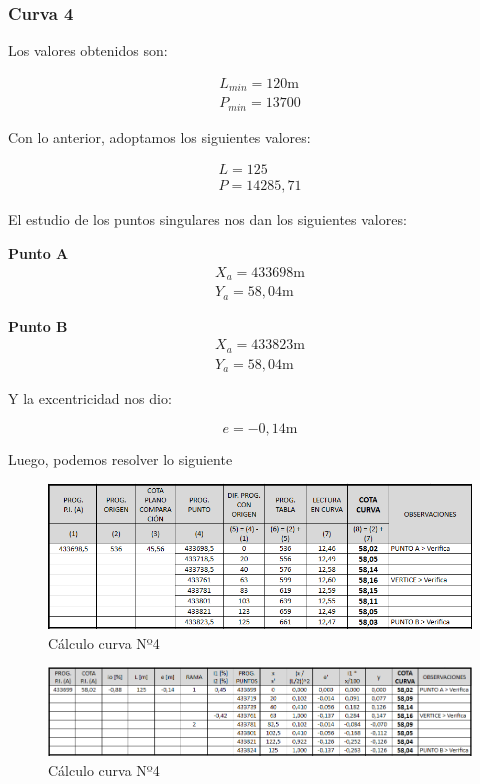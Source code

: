 \documentclass[../main.tex]{subfiles}
\begin{document}
\subsubsection{Curva 4}
Los valores obtenidos son:

\begin{align*}
    L_{min} = 120 \text{m} \\
    P_{min} = 13700
\end{align*}

Con lo anterior, adoptamos los siguientes valores:

\begin{align*}
    L = 125 \\
    P = 14285,71 
\end{align*}

El estudio de los puntos singulares nos dan los siguientes valores:

\textbf{Punto A}
\begin{align*}
    X_a = 433698 \text{m} \\
    Y_a = 58,04 \text{m}
\end{align*}

\textbf{Punto B}
\begin{align*}
    X_a = 433823 \text{m} \\
    Y_a = 58,04 \text{m}
\end{align*}

Y la excentricidad nos dio:

\begin{equation*}
    e = -0,14 \text{m}
\end{equation*}

Luego, podemos resolver lo siguiente

\begin{figure}[h]
    \centering
    \includegraphics[width=\textwidth]{images/google_sheets/Screenshot_16.png}
    \caption{Cálculo curva Nº4}
    \label{fig:curva4-1}
\end{figure}

\begin{figure}[h]
    \centering
    \includegraphics[width=\textwidth]{images/google_sheets/Screenshot_17.png}
    \caption{Cálculo curva Nº4}
    \label{fig:curva4-2}
\end{figure}
\end{document}
